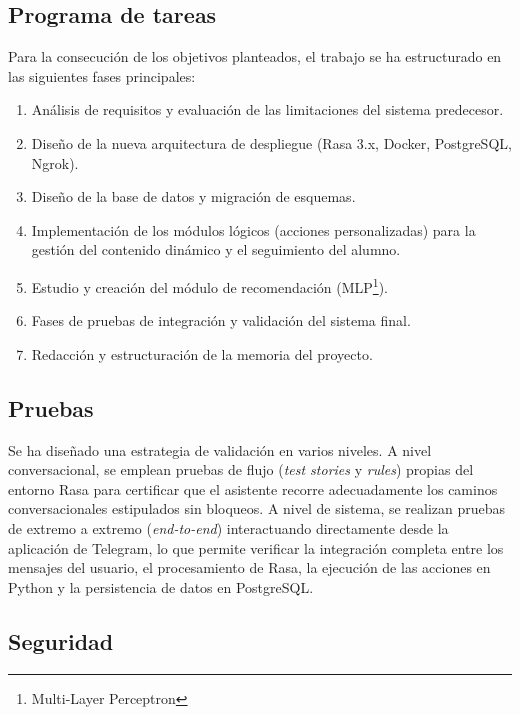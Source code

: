 \documentclass[a4paper,12pt,twoside,final]{book}
\begin{document}
\subsection{Programa de tareas}

Para la consecución de los objetivos planteados, el trabajo se ha estructurado en las siguientes fases principales:
\begin{enumerate}
    \item Análisis de requisitos y evaluación de las limitaciones del sistema predecesor.
    \item Diseño de la nueva arquitectura de despliegue (Rasa 3.x, Docker, PostgreSQL, Ngrok).
    \item Diseño de la base de datos y migración de esquemas.
    \item Implementación de los módulos lógicos (acciones personalizadas) para la gestión del contenido dinámico y el seguimiento del alumno.
    \item Estudio y creación del módulo de recomendación (MLP\footnote{Multi-Layer Perceptron}).
    \item Fases de pruebas de integración y validación del sistema final.
    \item Redacción y estructuración de la memoria del proyecto.
\end{enumerate}

\subsection{Pruebas}

Se ha diseñado una estrategia de validación en varios niveles. A nivel conversacional, se emplean pruebas de flujo (\textit{test stories} y \textit{rules}) propias del entorno Rasa para certificar que el asistente recorre adecuadamente los caminos conversacionales estipulados sin bloqueos. A nivel de sistema, se realizan pruebas de extremo a extremo (\textit{end-to-end}) interactuando directamente desde la aplicación de Telegram, lo que permite verificar la integración completa entre los mensajes del usuario, el procesamiento de Rasa, la ejecución de las acciones en Python y la persistencia de datos en PostgreSQL.

\subsection{Seguridad}
\end{document}
